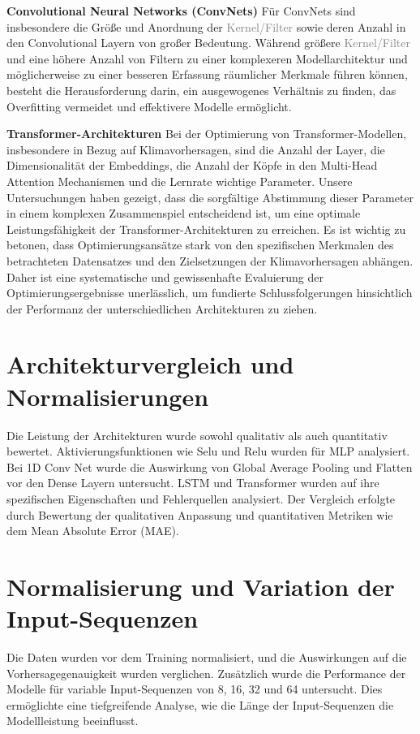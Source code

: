 \documentclass[manuscript,screen,review]{acmart}
\begin{document}
\textbf{Convolutional Neural Networks (ConvNets)}
Für ConvNets sind insbesondere die Größe und Anordnung der \textcolor{gray}{Kernel/Filter} sowie deren Anzahl in den Convolutional Layern von großer Bedeutung. 
Während größere \textcolor{gray}{Kernel/Filter} und eine höhere Anzahl von Filtern zu einer komplexeren Modellarchitektur und möglicherweise zu einer besseren Erfassung räumlicher Merkmale führen können, 
besteht die Herausforderung darin, ein ausgewogenes Verhältnis zu finden, das Overfitting vermeidet und effektivere Modelle ermöglicht.

\textbf{Transformer-Architekturen}
Bei der Optimierung von Transformer-Modellen, insbesondere in Bezug auf Klimavorhersagen, sind die Anzahl der Layer, die Dimensionalität der Embeddings, die Anzahl der Köpfe in den Multi-Head Attention Mechanismen und die Lernrate wichtige Parameter. Unsere Untersuchungen haben gezeigt, dass die sorgfältige Abstimmung dieser Parameter in einem komplexen Zusammenspiel entscheidend ist, um eine optimale Leistungsfähigkeit der Transformer-Architekturen zu erreichen.
Es ist wichtig zu betonen, dass Optimierungsansätze stark von den spezifischen Merkmalen des betrachteten Datensatzes und den Zielsetzungen der Klimavorhersagen abhängen. Daher ist eine systematische und gewissenhafte Evaluierung der Optimierungsergebnisse unerlässlich, um fundierte Schlussfolgerungen hinsichtlich der Performanz der unterschiedlichen Architekturen zu ziehen.


\section{Architekturvergleich und Normalisierungen}

Die Leistung der Architekturen wurde sowohl qualitativ als auch quantitativ bewertet. Aktivierungsfunktionen wie Selu und Relu wurden für MLP analysiert. Bei 1D Conv Net wurde die Auswirkung von Global Average Pooling und Flatten vor den Dense Layern untersucht. LSTM und Transformer wurden auf ihre spezifischen Eigenschaften und Fehlerquellen analysiert. Der Vergleich erfolgte durch Bewertung der qualitativen Anpassung und quantitativen Metriken wie dem Mean Absolute Error (MAE).


\section{Normalisierung und Variation der Input-Sequenzen}

Die Daten wurden vor dem Training normalisiert, und die Auswirkungen auf die Vorhersagegenauigkeit wurden verglichen. Zusätzlich wurde die Performance der Modelle für variable Input-Sequenzen von 8, 16, 32 und 64 untersucht. Dies ermöglichte eine tiefgreifende Analyse, wie die Länge der Input-Sequenzen die Modellleistung beeinflusst.
\end{document}
